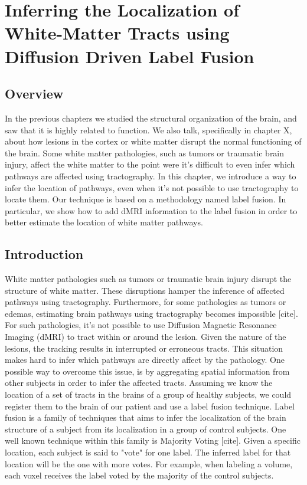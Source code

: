 \chapter{Inferring the Localization of White-Matter Tracts using Diffusion Driven Label Fusion}

\section{Overview}
In the previous chapters we studied the structural organization of the brain,
and saw that it is highly related to function. We also talk, specifically in
chapter X, about how lesions in the cortex or white matter disrupt the normal
functioning of the brain. Some white matter pathologies, such as tumors
or traumatic brain injury, affect the white matter to the point were it's
difficult to even infer which pathways are affected using tractography.
In this chapter, we introduce a way to infer the location of pathways, even
when it's not possible to use tractography to locate them. Our technique is
based on a methodology named label fusion. In particular, we show how to add
dMRI information to the label fusion in order to better estimate the location
of white matter pathways.

\section{Introduction}

White matter pathologies such as tumors or traumatic brain injury disrupt the
structure of white matter. These disruptions hamper the inference of affected
pathways using tractography. Furthermore, for some pathologies as tumors or
edemas, estimating brain pathways using tractography becomes impossible [cite].
For such pathologies, it's not possible to use Diffusion Magnetic Resonance
Imaging (dMRI) to tract within or around the lesion. Given the nature of the
lesions, the tracking results in interrupted or erroneous tracts. This situation
makes hard to infer which pathways are directly affect by the pathology. One
possible way to overcome this issue, is by aggregating spatial information
from other subjects in order to infer the affected tracts. Assuming we know the
location of a set of tracts in the brains of a group of healthy subjects, we
could register them to the brain of our patient and use a label fusion technique.
Label fusion is a family of techniques that aims to infer the localization of the
brain structure of a subject from its localization in a group of control subjects.
One well known technique within this family is Majority Voting [cite]. Given a
specific location, each subject is said to "vote" for one label. The inferred
label for that location will be the one with more votes. For example, when
labeling a volume, each voxel receives the label voted by the majority of the
control subjects.

